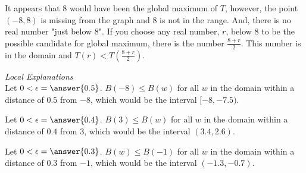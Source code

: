 \documentclass{ximera}
\begin{document}
It appears that $8$ would have been the global maximum of $T$, however, the point $(-8, 8)$ is missing from the graph and $8$ is not in the range.  And, there is no real number "just below $8$".  If you choose any real number, $r$, below $8$ to be the possible candidate for global maximum, there is the number $\frac{8+r}{2}$. This number is in the domain and $T(r) < T\left(\frac{8+r}{2}\right)$.




\textit{Local Explanations} \\

Let $0 < \epsilon = \answer{0.5}$.  $B(-8) \leq B(w)$ for all $w$ in the domain within a distance of $0.5$ from $-8$, which would be the interval $[-8, -7.5)$.

Let $0 < \epsilon = \answer{0.4}$.  $B(3) \leq B(w)$ for all $w$ in the domain within a distance of $0.4$ from $3$, which would be the interval $(3.4, 2.6)$.

Let $0 < \epsilon = \answer{0.3}$.  $B(w) \leq B(-1)$ for all $w$ in the domain within a distance of $0.3$ from $-1$, which would be the interval $(-1.3, -0.7)$.
\end{document}
